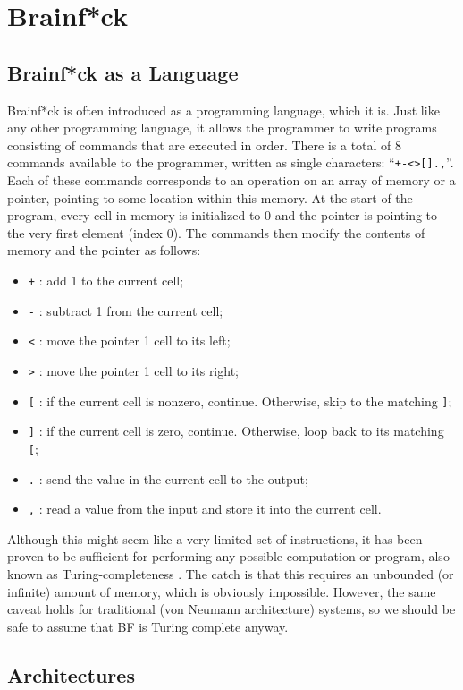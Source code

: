 \section{Brainf*ck}\label{section:brainfck}
\subsection{Brainf*ck as a Language}
Brainf*ck is often introduced as a programming language, which it is. Just like any other programming language, it allows the programmer to write programs consisting of commands that are executed in order. There is a total of 8 commands available to the programmer, written as single characters: ``\texttt{+-<>[].,}''. Each of these commands corresponds to an operation on an array of memory or a pointer, pointing to some location within this memory. At the start of the program, every cell in memory is initialized to 0 and the pointer is pointing to the very first element (index 0). The commands then modify the contents of memory and the pointer as follows:
\begin{itemize}
\item \texttt{+} : add 1 to the current cell;
\item \texttt{-} : subtract 1 from the current cell;
\item \texttt{<} : move the pointer 1 cell to its left;
\item \texttt{>} : move the pointer 1 cell to its right;
\item \texttt{[} : if the current cell is nonzero, continue. Otherwise, skip to the matching \texttt{]};
\item \texttt{]} : if the current cell is zero, continue. Otherwise, loop back to its matching \texttt{[};
  \item \texttt{.} : send the value in the current cell to the output;
  \item \texttt{,} : read a value from the input and store it into the current cell.
\end{itemize}
Although this might seem like a very limited set of instructions, it has been proven to be sufficient for performing any possible computation or program, also known as Turing-completeness \cite{esolang}. The catch is that this requires an unbounded (or infinite) amount of memory, which is obviously impossible. However, the same caveat holds for traditional (von Neumann architecture) systems, so we should be safe to assume that BF is Turing complete anyway.

\subsection{Architectures}
